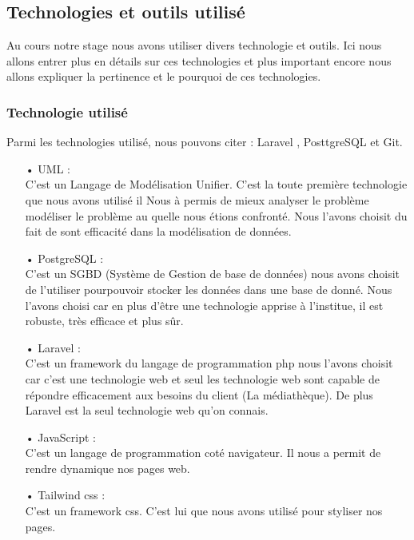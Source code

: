 \documentclass[12pt,a4paper]{article}
\begin{document}
\subsection{Technologies et outils utilisé}
Au cours notre stage nous avons utiliser divers technologie et outils. Ici nous allons 
entrer plus en détails sur ces technologies et plus important encore nous allons 
expliquer la pertinence et le pourquoi de ces technologies.\\
\subsubsection{Technologie utilisé}
Parmi les technologies utilisé, nous pouvons citer : Laravel , PosttgreSQL et Git.
\begin{itemize}
\item[•] UML : \\
C'est un Langage de Modélisation Unifier. C'est la toute première technologie que nous avons
utilisé il Nous à permis de mieux analyser le problème modéliser le problème au quelle
nous étions confronté. Nous l'avons choisit du fait de sont efficacité dans la modélisation
de données.
\item[•] PostgreSQL : \\
C'est un SGBD (Système de Gestion de base de données) nous avons choisit de l'utiliser
pourpouvoir stocker les données dans une base de donné. Nous l'avons choisi car en
plus d'être une technologie apprise à l'institue, il est robuste, très efficace et plus
sûr.
\item[•] Laravel : \\
C'est un framework du langage de programmation php nous l'avons choisit car c'est une
technologie web et seul les technologie web sont capable de répondre efficacement aux besoins du
client (La médiathèque). De plus Laravel est la seul technologie web qu'on connais.
\item[•] JavaScript : \\
C'est un langage de programmation coté navigateur. Il nous a permit de rendre dynamique nos pages
web.
\item[•] Tailwind css : \\
C'est un framework css. C'est lui que nous avons utilisé pour styliser nos pages.
\end{itemize}
\end{document}
